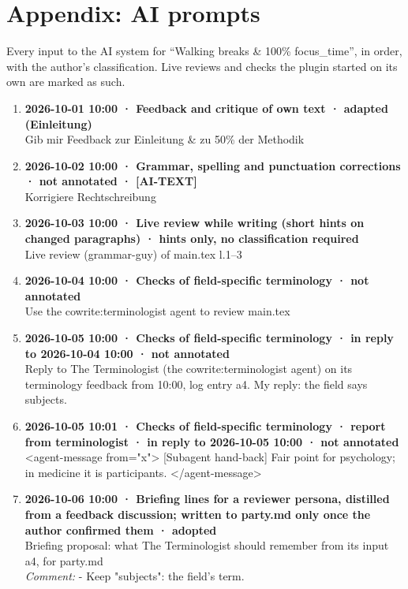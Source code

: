 \section*{Appendix: AI prompts}

Every input to the AI system for “Walking breaks \& 100\% focus\_time”, in order, with the author's classification. Live reviews and checks the plugin started on its own are marked as such.

\begin{enumerate}
  \item \textbf{2026-10-01 10:00 · Feedback and critique of own text · adapted (Einleitung)} \\
  Gib mir Feedback zur Einleitung \& zu 50\% der Methodik
  \item \textbf{2026-10-02 10:00 · Grammar, spelling and punctuation corrections · not annotated · [AI-TEXT]} \\
  Korrigiere Rechtschreibung
  \item \textbf{2026-10-03 10:00 · Live review while writing (short hints on changed paragraphs) · hints only, no classification required} \\
  Live review (grammar-guy) of main.tex l.1–3
  \item \textbf{2026-10-04 10:00 · Checks of field-specific terminology · not annotated} \\
  Use the cowrite:terminologist agent to review main.tex
  \item \textbf{2026-10-05 10:00 · Checks of field-specific terminology · in reply to 2026-10-04 10:00 · not annotated} \\
  Reply to The Terminologist (the cowrite:terminologist agent) on its terminology feedback from 10:00, log entry a4. My reply: the field says subjects.
  \item \textbf{2026-10-05 10:01 · Checks of field-specific terminology · report from terminologist · in reply to 2026-10-05 10:00 · not annotated} \\
  <agent-message from="x"> [Subagent hand-back] Fair point for psychology; in medicine it is participants. </agent-message>
  \item \textbf{2026-10-06 10:00 · Briefing lines for a reviewer persona, distilled from a feedback discussion; written to party.md only once the author confirmed them · adopted} \\
  Briefing proposal: what The Terminologist should remember from its input a4, for party.md
  \\ \textit{Comment:} - Keep "subjects": the field's term.

\end{enumerate}
